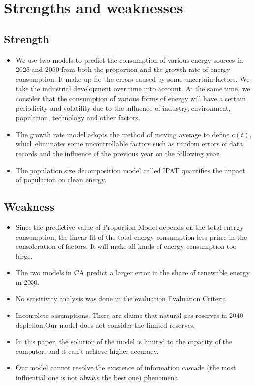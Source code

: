 \section{Strengths and weaknesses}
\subsection{Strength}
\begin{itemize}
	\item We use two models to predict the consumption of various energy sources in 2025 and 2050 from both the proportion and the growth rate of energy consumption. It  make up for the errors caused by some uncertain factors. We take the industrial development over time into account. At the same time, we consider that the consumption of various forms of energy will have a certain periodicity and volatility due to the influence of industry, environment, population, technology and other factors.
	\item The growth rate model adopts the method of moving average to define $ c(t) $, which eliminates some uncontrollable factors such as random errors of data records and the influence of the previous year on the following year.
	\item The population size decomposition model called IPAT quantifies the impact of population on clean energy.
\end{itemize}
\subsection{Weakness}
\begin{itemize}
	\item Since the predictive value of Proportion Model depends on the total energy consumption, the linear fit of the total energy consumption less prime in the consideration of factors. It will make all kinds of energy consumption too large.	
	\item The two models in CA predict a larger error in the share of renewable energy in 2050.
	\item No sensitivity analysis was done in the evaluation Evaluation Criteria 
	\item Incomplete assumptions. There are claims that natural gas reserves in 2040 depletion.Our model does not consider the limited reserves.
	\item In this paper, the solution of the model is limited to the capacity of the computer, and it can't achieve higher accuracy.
	\item Our model cannot resolve the existence of information cascade (the most influential one is not always the best one) phenomena.
\end{itemize}

